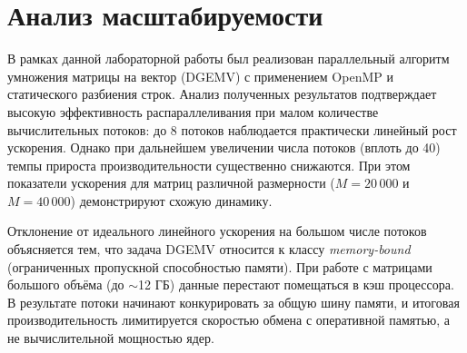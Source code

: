 \documentclass[12pt,a4paper]{article}
\begin{document}
\section*{Анализ масштабируемости}
В рамках данной лабораторной работы был реализован параллельный алгоритм умножения матрицы на вектор (DGEMV) с применением OpenMP и статического разбиения строк. Анализ полученных результатов подтверждает высокую эффективность распараллеливания при малом количестве вычислительных потоков: до 8 потоков наблюдается практически линейный рост ускорения. Однако при дальнейшем увеличении числа потоков (вплоть до 40) темпы прироста производительности существенно снижаются. При этом показатели ускорения для матриц различной размерности ($M=20\,000$ и $M=40\,000$) демонстрируют схожую динамику.

Отклонение от идеального линейного ускорения на большом числе потоков объясняется тем, что задача DGEMV относится к классу \textit{memory-bound} (ограниченных пропускной способностью памяти). При работе с матрицами большого объёма (до $\sim$12 ГБ) данные перестают помещаться в кэш процессора. В результате потоки начинают конкурировать за общую шину памяти, и итоговая производительность лимитируется скоростью обмена с оперативной памятью, а не вычислительной мощностью ядер.
\end{document}
